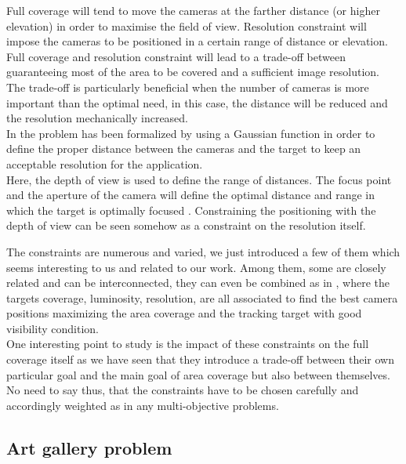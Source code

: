 \begin{itemize}
Full coverage will tend to move the cameras at the farther distance (or higher elevation) in order to maximise the field of view. Resolution constraint will impose the cameras to be positioned in a certain range of distance or elevation. Full coverage and resolution constraint will lead to a trade-off between guaranteeing most of the area to be covered and a sufficient image resolution. The trade-off is particularly beneficial when the number of cameras is more important than the optimal need, in this case, the distance will be reduced and the resolution mechanically increased. \\
   In \cite{33*reddy2012} the problem has been formalized by using a Gaussian function in order to define the proper distance between the cameras and the target to keep an acceptable resolution for the application. \\
Here, the depth of view is used to define the range of distances. The focus point and the aperture of the camera will define the optimal distance and range in which the target is optimally focused \cite{193*fu2014}. Constraining the positioning with the depth of view can be seen somehow as a constraint on the resolution itself. 

\end{itemize}

The constraints are numerous and varied, we just introduced a few of them which seems interesting to us and related to our work. Among them, some are closely related and can be interconnected, they can even be combined as in \cite{33*reddy2012}, where the targets coverage, luminosity, resolution, are all associated to find the best camera positions maximizing the area coverage and the tracking target with good visibility condition. \\
One interesting point to study is the impact of these constraints on the full coverage itself as we have seen that they introduce a trade-off between their own particular goal and the main goal of area coverage but also between themselves. No need to say thus, that the constraints have to be chosen carefully and accordingly weighted as in any multi-objective problems. 


\subsection{Art gallery problem} \label{sec:AGP}

